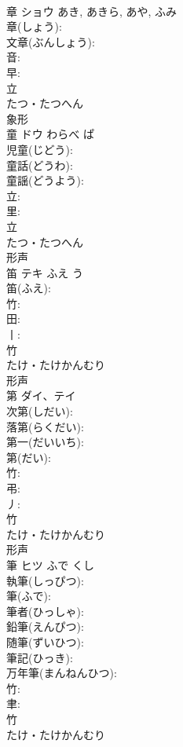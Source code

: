 \documentclass[8pt]{extreport}
\begin{document}
\begin{CJK}{UTF8}{min}
\\	章	ショウ		あき, あきら, あや, ふみ	
\\	章(しょう): 
\\	文章(ぶんしょう): 
\\	音: 
\\	早: 
\\	立	
\\	たつ・たつへん	
\\	象形 
\\	童	ドウ	わらべ	ぱ	
\\	児童(じどう): 
\\	童話(どうわ): 
\\	童謡(どうよう): 
\\	立: 
\\	里: 
\\	立	
\\	たつ・たつへん	
\\	形声 
\\	笛	テキ	ふえ	う	
\\	笛(ふえ): 
\\	竹: 
\\	田: 
\\	丨: 
\\	竹	
\\	たけ・たけかんむり	
\\	形声 
\\	第	ダイ、テイ			
\\	次第(しだい): 
\\	落第(らくだい): 
\\	第一(だいいち): 
\\	第(だい): 
\\	竹: 
\\	弔: 
\\	丿: 
\\	竹	
\\	たけ・たけかんむり	
\\	形声 
\\	筆	ヒツ	ふで	くし	
\\	執筆(しっぴつ): 
\\	筆(ふで): 
\\	筆者(ひっしゃ): 
\\	鉛筆(えんぴつ): 
\\	随筆(ずいひつ): 
\\	筆記(ひっき): 
\\	万年筆(まんねんひつ): 
\\	竹: 
\\	聿: 
\\	竹	
\\	たけ・たけかんむり	

\end{CJK}
\end{document}
